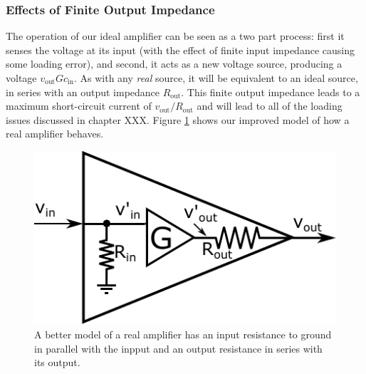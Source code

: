 \documentclass[]{article}
\begin{document}
\subsubsection{Effects of Finite Output Impedance}
The operation of our ideal amplifier can be seen as a two part process: first it senses the voltage at its input (with the effect of finite input impedance causing some loading error), and second, it acts as a new voltage source, producing a voltage $v_\text{out} Gc_\text{in}$. As with any \textit{real} source, it will be equivalent to an ideal source, in series with an output impedance $R_\text{out}$. This finite output impedance leads to a maximum short-circuit current of $v_\text{out}/R_\text{out}$ and will lead to all of the loading issues discussed in chapter XXX. Figure \ref{fig:real_amp_int_out} shows our improved model of how a real amplifier behaves.
\begin{figure}[h]
\caption{A better model of a real amplifier has an input resistance to ground in parallel with the inpput and an output resistance in series with its output.}
\label{fig:real_amp_int_out}
\begin{center}
\includegraphics{Images/RealAmplifier_int_out.pdf}
\end{center}
\end{figure}
\end{document}

